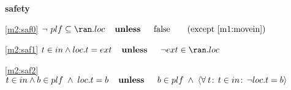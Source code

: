 \textbf{safety}
\begin{block}
\item[ \eqref{m2:saf0} ]{$\neg ~ plf \subseteq \ran.loc  \textbf{\quad unless \quad} \false\qquad  \text{(except \ref{m1:movein})}$} %
\item[ \eqref{m2:saf1} ]{$t \in in \land loc.t = ext  \textbf{\quad unless \quad} \neg ext \in \ran. loc $} %
\item[ \eqref{m2:saf2} ]{$t \in in \land b \in plf \; \land \;  loc.t = b  \textbf{\quad unless \quad} b \in plf \; \land \; { \langle \forall \:t\!:\,  t \in in \!:\,  \neg loc.t = b  \rangle } $} %
\end{block}
